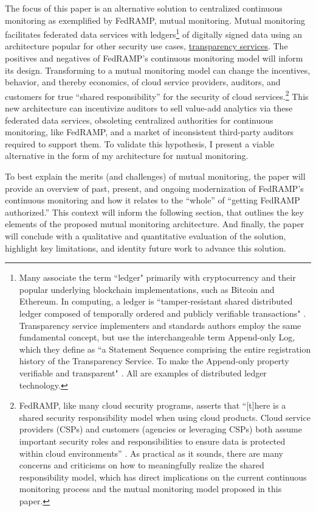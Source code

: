 \documentclass{jdf}
\begin{document}
The focus of this paper is an alternative solution to centralized continuous monitoring as exemplified by FedRAMP, mutual monitoring. Mutual monitoring facilitates federated data services with ledgers\footnote{Many associate the term ``ledger" primarily with cryptocurrency and their popular underlying blockchain implementations, such as Bitcoin and Ethereum. In computing, a ledger is ``tamper-resistant shared distributed ledger composed of temporally ordered and publicly verifiable transactions" \cite{bashir22}. Transparency service implementers and standards authors employ the same fundamental concept, but use the interchangeable term Append-only Log, which they define as ``a Statement Sequence comprising the entire registration history of the Transparency Service. To make the Append-only property verifiable and transparent" \cite{scitt25}. All are examples of distributed ledger technology.} of digitally signed data using an architecture popular for other security use cases, \href{https://transparency.dev}{transparency services}. The positives and negatives of FedRAMP's continuous monitoring model will inform its design. Transforming to a mutual monitoring model can change the incentives, behavior, and thereby economics, of cloud service providers, auditors, and customers for true ``shared responsibility'' for the security of cloud services.\footnote{FedRAMP, like many cloud security programs, asserts that ``[t]here is a shared security responsibility model when using cloud products. Cloud service providers (CSPs) and customers (agencies or leveraging CSPs) both assume important security roles and responsibilities to ensure data is protected within cloud environments'' \citeyear{fedramp_srm25}. As practical as it sounds, there are many concerns and criticisms on how to meaningfully realize the shared responsibility model, which has direct implications on the current continuous monitoring process and the mutual monitoring model proposed in this paper.} This new architecture can incentivize auditors to sell value-add analytics via these federated data services, obsoleting centralized authorities for continuous monitoring, like FedRAMP, and a market of inconsistent third-party auditors required to support them. To validate this hypothesis, I present a viable alternative in the form of my architecture for mutual monitoring.

To best explain the merits (and challenges) of mutual monitoring, the paper will provide an overview of past, present, and ongoing modernization of FedRAMP's continuous monitoring and how it relates to the ``whole'' of ``getting FedRAMP authorized.'' This context will inform the following section, that outlines the key elements of the proposed mutual monitoring architecture. And finally, the paper will conclude with a qualitative and quantitative evaluation of the solution, highlight key limitations, and identity future work to advance this solution.
\end{document}
